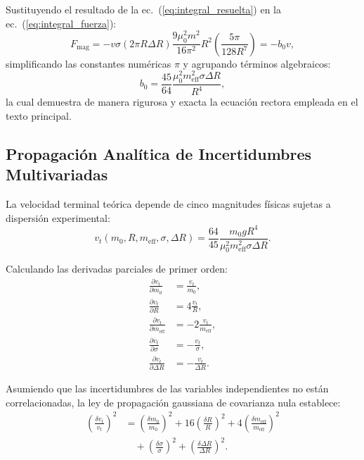 \documentclass[aps,prb,reprint,twocolumn,superscriptaddress,amsmath,amssymb,floatfix]{revtex4-2}
\begin{document}
Sustituyendo el resultado de la ec.~(\ref{eq:integral_resuelta}) en la ec.~(\ref{eq:integral_fuerza}):
\begin{equation}
F_{\mathrm{mag}} = -v \sigma (2\pi R \Delta R) \frac{9\mu_0^2 m^2}{16\pi^2} R^2 \left( \frac{5\pi}{128 R^7} \right) = -b_0 v,
\label{eq:f_final}
\end{equation}
simplificando las constantes numéricas $\pi$ y agrupando términos algebraicos:
\begin{equation}
b_0 = \frac{45}{64} \frac{\mu_0^2 m_{\mathrm{eff}}^2 \sigma \Delta R}{R^4},
\label{eq:b_deducido}
\end{equation}
la cual demuestra de manera rigurosa y exacta la ecuación rectora empleada en el texto principal.

\subsection{Propagación Analítica de Incertidumbres Multivariadas}
La velocidad terminal teórica depende de cinco magnitudes físicas sujetas a dispersión experimental:
\begin{equation}
v_t(m_0, R, m_{\mathrm{eff}}, \sigma, \Delta R) = \frac{64}{45} \frac{m_0 g R^4}{\mu_0^2 m_{\mathrm{eff}}^2 \sigma \Delta R}.
\label{eq:vt_func}
\end{equation}

Calculando las derivadas parciales de primer orden:
\begin{align}
\frac{\partial v_t}{\partial m_0} &= \frac{v_t}{m_0}, \label{eq:dvt_dm} \\
\frac{\partial v_t}{\partial R} &= 4\frac{v_t}{R}, \label{eq:dvt_dr} \\
\frac{\partial v_t}{\partial m_{\mathrm{eff}}} &= -2\frac{v_t}{m_{\mathrm{eff}}}, \label{eq:dvt_dmeff} \\
\frac{\partial v_t}{\partial \sigma} &= -\frac{v_t}{\sigma}, \label{eq:dvt_dsigma} \\
\frac{\partial v_t}{\partial \Delta R} &= -\frac{v_t}{\Delta R}. \label{eq:dvt_ddeltar}
\end{align}

Asumiendo que las incertidumbres de las variables independientes no están correlacionadas, la ley de propagación gaussiana de covarianza nula establece:
\begin{align}
\left( \frac{\delta v_t}{v_t} \right)^2 &= \left( \frac{\delta m_0}{m_0} \right)^2 + 16\left( \frac{\delta R}{R} \right)^2 + 4\left( \frac{\delta m_{\mathrm{eff}}}{m_{\mathrm{eff}}} \right)^2 \nonumber \\
&\quad + \left( \frac{\delta \sigma}{\sigma} \right)^2 + \left( \frac{\delta \Delta R}{\Delta R} \right)^2. \label{eq:propagacion_cuadratica}
\end{align}
\end{document}
